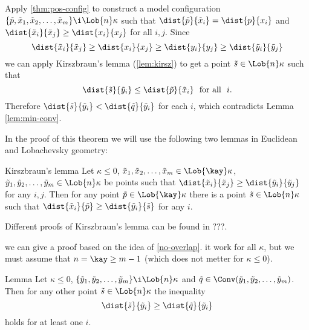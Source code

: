 {Apply \ref{thm:pos-config} to construct a model configuration 
$\{\tilde p,\tilde x_1,\tilde x_2,\dots,\tilde x_m\}\i \Lob{n}\kappa$ such that
$\dist{\tilde p}{\tilde x_i}=\dist{p}{x_i}$ 
and $\dist{\tilde x_i}{\tilde x_j}\ge \dist{x_i}{x_j}$ for all $i,j$.
Since 
$$\dist{\tilde x_i}{\tilde x_j}\ge \dist{x_i}{x_j}\ge \dist{y_i}{y_j}\ge\dist{\tilde y_i}{\tilde y_j}$$ 
we can apply Kirszbraun's lemma (\ref{lem:kirsz}) to  get a point $\tilde s\in \Lob{n}\kappa$ such that
$$\dist{\tilde s}{\tilde y_i}\le \dist{\tilde p}{\tilde x_i}\ \ \text{for all}\ \ i.$$
Therefore $\dist{\tilde s}{\tilde y_i}<\dist{\tilde q}{\tilde y_i}$ for each $i$, which contradicts Lemma \ref{lem:min-conv}.


























In the proof of this theorem we will use the following two lemmas in Euclidean and
Lobachevsky geometry:

\begin{thm}{Kirszbraun's lemma}\label{lem:kirsz}
Let $\kappa\le 0$, 
$\tilde x_1,\tilde x_2,\dots,\tilde x_m \in \Lob{\kay}\kappa$,
$\tilde y_1,\tilde y_2,\dots,\tilde y_m\in \Lob{n}\kappa$ be points such that $\dist{\tilde x_i}{\tilde x_j}\ge \dist{\tilde y_i}{\tilde y_j}$ for any $i,j$.
Then for any point $\tilde p\in \Lob{\kay}\kappa$ there is a point $\tilde s\in \Lob{n}\kappa$ such that $\dist{\tilde x_i}{\tilde p}\ge \dist{\tilde y_i}{\tilde s}$ for any $i$.
\end{thm}

Different proofs of Kirszbraun's lemma can be found in ???.

 we can give a proof based on the idea of \ref{no-overlap}. it work for all $\kappa$, but we must assume that $n=\kay\ge m-1$ (which does not metter for $\kappa\le 0$).

\begin{thm}{Lemma}\label{lem:min-conv}
Let $\kappa\le 0$, 
$\{\tilde y_1,\tilde y_2,\dots,\tilde y_m\}\i \Lob{n}\kappa$ 
and $\tilde q\in \Conv(\tilde y_1,\tilde y_2,\dots,\tilde y_m)$. 
Then for any other point $\tilde s\in \Lob{n}\kappa$ the inequality 
$$\dist{\tilde s}{\tilde y_i}\ge \dist{\tilde q}{\tilde y_i}$$
holds for at least one $i$.
\end{thm}

}
